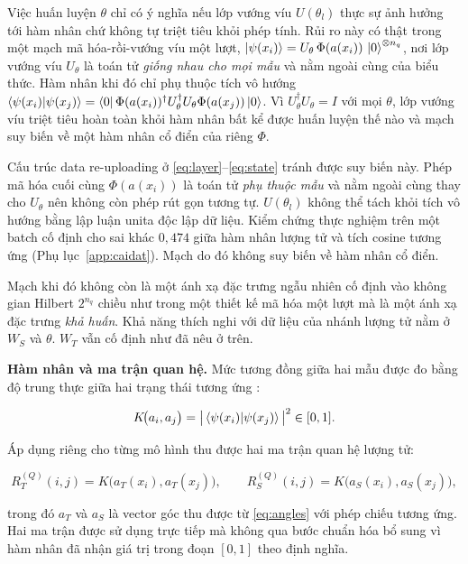 Việc huấn luyện $\theta$ chỉ có ý nghĩa nếu lớp vướng víu $U(\theta_l)$
thực sự ảnh hưởng tới hàm nhân chứ không tự triệt tiêu khỏi phép tính.
Rủi ro này có thật trong một mạch mã hóa-rồi-vướng víu một lượt,
$\ket{\psi(x_i)} = U_\theta\,\Phi(a(x_i))\,\ket{0}^{\otimes n_q}$, nơi lớp
vướng víu $U_\theta$ là toán tử \emph{giống nhau cho mọi mẫu} và nằm ngoài
cùng của biểu thức. Hàm nhân khi đó chỉ phụ thuộc tích vô hướng
$\braket{\psi(x_i)|\psi(x_j)} = \bra{0}\Phi(a(x_i))^\dagger U_\theta^\dagger U_\theta \Phi(a(x_j))\ket{0}$. Vì $U_\theta^\dagger U_\theta = I$ với mọi $\theta$, lớp vướng víu triệt tiêu hoàn toàn khỏi hàm nhân bất kể được huấn luyện thế nào và mạch suy biến về một hàm nhân cổ điển của riêng $\Phi$.

Cấu trúc data re-uploading ở \eqref{eq:layer}--\eqref{eq:state} tránh
được suy biến này. Phép mã hóa cuối cùng $\Phi(a(x_i))$ là toán tử
\emph{phụ thuộc mẫu} và nằm ngoài cùng thay cho $U_\theta$ nên không còn
phép rút gọn tương tự. $U(\theta_l)$ không thể tách khỏi tích vô hướng
bằng lập luận unita độc lập dữ liệu. Kiểm chứng thực nghiệm trên một batch cố định cho sai khác $0{,}474$ giữa hàm nhân lượng tử và tích cosine tương ứng (Phụ lục~\ref{app:caidat}). Mạch do đó không suy biến về hàm nhân cổ điển.

Mạch khi đó không còn là một ánh xạ đặc trưng ngẫu nhiên cố định vào không
gian Hilbert $2^{n_q}$ chiều như trong một thiết kế mã hóa một lượt mà là
một ánh xạ đặc trưng \emph{khả huấn}. Khả năng thích nghi với dữ liệu của
nhánh lượng tử nằm ở $W_S$ và $\theta$. $W_T$ vẫn cố định như đã nêu ở trên.

\textbf{Hàm nhân và ma trận quan hệ.} Mức tương đồng giữa hai mẫu được đo
bằng độ trung thực giữa hai trạng thái tương ứng \cite{schuld2019quantum}:

\begin{equation}
\label{eq:kernel}
K\!\big(a_i, a_j\big) =
  \big| \braket{ \psi(x_i) | \psi(x_j) } \big|^{2} \in [0,1].
\end{equation}

Áp dụng riêng cho từng mô hình thu được hai ma trận quan hệ lượng tử:

\begin{equation}
\label{eq:relmat}
R_T^{(Q)}(i,j) = K\!\big(a_T(x_i), a_T(x_j)\big),
\qquad
R_S^{(Q)}(i,j) = K\!\big(a_S(x_i), a_S(x_j)\big),
\end{equation}

trong đó $a_T$ và $a_S$ là vector góc thu được từ \eqref{eq:angles} với phép
chiếu tương ứng. Hai ma trận được sử dụng trực tiếp mà không qua bước chuẩn hóa
bổ sung vì hàm nhân đã nhận giá trị trong đoạn $[0,1]$ theo định nghĩa.

